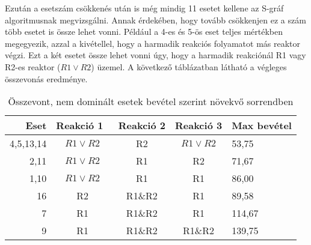 Ezután a esetszám csökkenés után is még mindig 11 esetet kellene az S-gráf algoritmusnak megvizsgálni. Annak érdekében, hogy tovább csökkenjen ez a szám több esetet is össze lehet vonni. Például a 4-es és 5-ös eset teljes mértékben megegyezik, azzal a kivétellel, hogy a harmadik reakciós folyamatot más reaktor végzi. Ezt a két esetet össze lehet vonni úgy, hogy a harmadik reakciónál R1 vagy R2-es reaktor ($R1 \vee R2$) üzemel. A következő táblázatban látható a végleges összevonás eredménye.

\begin{table}[H]
	\begin{center}
		\caption{Összevont, nem dominált esetek bevétel szerint növekvő sorrendben}
		\captionsetup[table]{skip=10pt}		
		\begin{tabular}{r|ccc|l}
		Eset      & Reakció 1~ & Reakció 2 & Reakció 3 & Max bevétel  \\ 
		\hline
		4,5,13,14 & $R1 \vee R2$      & R2 & $R1 \vee R2$     & 53,75        \\
		2,11      & $R1 \vee R2$      & R1        & R2        & 71,67        \\
		1,10      & $R1 \vee R2$      & R1        & R1        & 86,00        \\
		16        & R2         & R1\&R2    & R1        & 89,58        \\
		7         & R1         & R1\&R2    & R1        & 114,67       \\
		9         & R1         & R1\&R2    & R1\&R2    & 139,75      
		\end{tabular}
	\end{center}
\end{table}




